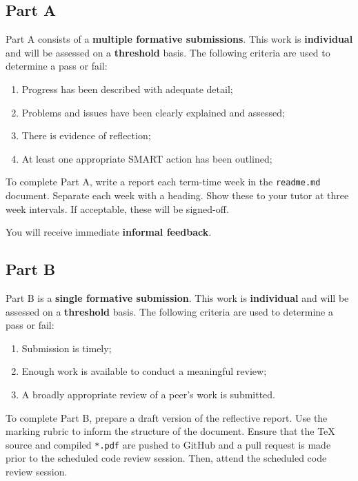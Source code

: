 \documentclass{../fal_assignment}
\begin{document}
\subsection*{Part A}

Part A consists of a \textbf{multiple formative submissions}. This work is \textbf{individual} and will be assessed on a \textbf{threshold} basis. The following criteria are used to determine a pass or fail:

\begin{enumerate}[label=(\alph*)]
	\item Progress has been described with adequate detail;
	\item Problems and issues have been clearly explained and assessed;
	\item There is evidence of reflection;
	\item At least one appropriate SMART action has been outlined;
\end{enumerate}

To complete Part A, write a report each term-time week in the \texttt{readme.md} document. Separate each week with a heading. Show these to your tutor at three week intervals.  If acceptable, these will be signed-off. 

You will receive immediate \textbf{informal feedback}.

\subsection*{Part B}

Part B is a \textbf{single formative submission}. This work is \textbf{individual} and will be assessed on a \textbf{threshold} basis. The following criteria are used to determine a pass or fail:

\begin{enumerate}[label=(\alph*)]
	\item Submission is timely;
	\item Enough work is available to conduct a meaningful review;
	\item A broadly appropriate review of a peer's work is submitted.
\end{enumerate}

To complete Part B, prepare a draft version of the reflective report. Use the marking rubric to inform the structure of the document. Ensure that the TeX source and compiled \texttt{*.pdf} are pushed to GitHub and a pull request is made prior to the scheduled code review session. Then, attend the scheduled code review session.
\end{document}
